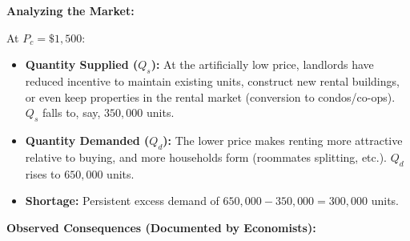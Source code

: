\documentclass[10pt,a4paper]{article}
\begin{document}
\begin{multicols}{2}
\textbf{Analyzing the Market:}

At $P_c = \$1,500$:
\begin{itemize}[leftmargin=*,nosep]
    \item \textbf{Quantity Supplied ($Q_s$):} At the artificially low price, landlords have reduced incentive to maintain existing units, construct new rental buildings, or even keep properties in the rental market (conversion to condos/co-ops). $Q_s$ falls to, say, $350,000$ units.
    \item \textbf{Quantity Demanded ($Q_d$):} The lower price makes renting more attractive relative to buying, and more households form (roommates splitting, etc.). $Q_d$ rises to $650,000$ units.
    \item \textbf{Shortage:} Persistent excess demand of $650,000 - 350,000 = 300,000$ units.
\end{itemize}

\begin{center}
\end{center}

\textbf{Observed Consequences (Documented by Economists):}


\end{multicols}
\end{document}
